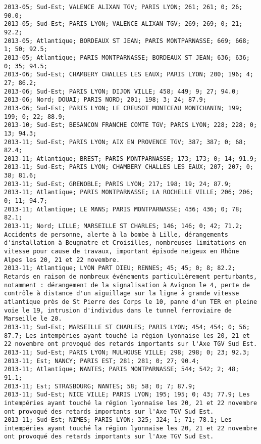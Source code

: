 \documentclass{article}
\begin{document}
\begin{Verbatim}[commandchars=\\\{\}]
2013-05; Sud-Est; VALENCE ALIXAN TGV; PARIS LYON; 261; 261; 0; 26; 90.0; 
2013-05; Sud-Est; PARIS LYON; VALENCE ALIXAN TGV; 269; 269; 0; 21; 92.2; 
2013-05; Atlantique; BORDEAUX ST JEAN; PARIS MONTPARNASSE; 669; 668; 1; 50; 92.5; 
2013-05; Atlantique; PARIS MONTPARNASSE; BORDEAUX ST JEAN; 636; 636; 0; 35; 94.5; 
2013-06; Sud-Est; CHAMBERY CHALLES LES EAUX; PARIS LYON; 200; 196; 4; 27; 86.2; 
2013-06; Sud-Est; PARIS LYON; DIJON VILLE; 458; 449; 9; 27; 94.0; 
2013-06; Nord; DOUAI; PARIS NORD; 201; 198; 3; 24; 87.9; 
2013-06; Sud-Est; PARIS LYON; LE CREUSOT MONTCEAU MONTCHANIN; 199; 199; 0; 22; 88.9; 
2013-10; Sud-Est; BESANCON FRANCHE COMTE TGV; PARIS LYON; 228; 228; 0; 13; 94.3; 
2013-11; Sud-Est; PARIS LYON; AIX EN PROVENCE TGV; 387; 387; 0; 68; 82.4; 
2013-11; Atlantique; BREST; PARIS MONTPARNASSE; 173; 173; 0; 14; 91.9; 
2013-11; Sud-Est; PARIS LYON; CHAMBERY CHALLES LES EAUX; 207; 207; 0; 38; 81.6; 
2013-11; Sud-Est; GRENOBLE; PARIS LYON; 217; 198; 19; 24; 87.9; 
2013-11; Atlantique; PARIS MONTPARNASSE; LA ROCHELLE VILLE; 206; 206; 0; 11; 94.7; 
2013-11; Atlantique; LE MANS; PARIS MONTPARNASSE; 436; 436; 0; 78; 82.1; 
2013-11; Nord; LILLE; MARSEILLE ST CHARLES; 146; 146; 0; 42; 71.2; Accidents de personne, alerte à la bombe à Lille, dérangements d'installation à Beugnatre et Croisilles, nombreuses limitations en vitesse pour cause de travaux, important épisode neigeux en Rhône Alpes les 20, 21 et 22 novembre.
2013-11; Atlantique; LYON PART DIEU; RENNES; 45; 45; 0; 8; 82.2; Retards en raison de nombreux événements particulièrement perturbants, notamment : dérangement de la signalisation à Avignon le 4, perte de contrôle à distance d'un aiguillage sur la ligne à grande vitesse atlantique près de St Pierre des Corps le 10, panne d'un TER en pleine voie le 19, intrusion d'individus dans le tunnel ferroviaire de Marseille le 20.
2013-11; Sud-Est; MARSEILLE ST CHARLES; PARIS LYON; 454; 454; 0; 56; 87.7; Les intempéries ayant touché la région lyonnaise les 20, 21 et 22 novembre ont provoqué des retards importants sur l'Axe TGV Sud Est.
2013-11; Sud-Est; PARIS LYON; MULHOUSE VILLE; 298; 298; 0; 23; 92.3; 
2013-11; Est; NANCY; PARIS EST; 281; 281; 0; 27; 90.4; 
2013-11; Atlantique; NANTES; PARIS MONTPARNASSE; 544; 542; 2; 48; 91.1; 
2013-11; Est; STRASBOURG; NANTES; 58; 58; 0; 7; 87.9; 
2013-11; Sud-Est; NICE VILLE; PARIS LYON; 195; 195; 0; 43; 77.9; Les intempéries ayant touché la région lyonnaise les 20, 21 et 22 novembre ont provoqué des retards importants sur l'Axe TGV Sud Est.
2013-11; Sud-Est; NIMES; PARIS LYON; 325; 324; 1; 71; 78.1; Les intempéries ayant touché la région lyonnaise les 20, 21 et 22 novembre ont provoqué des retards importants sur l'Axe TGV Sud Est.

\end{Verbatim}
\end{document}
